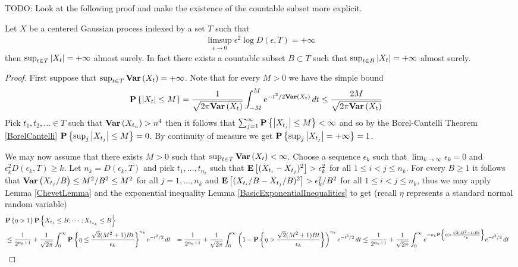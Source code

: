 TODO: Look at the following proof and make the existence of the countable subset more explicit.
\begin{thm}\label{SudakovChevet}Let $X$ be a centered Gaussian process indexed by a set $T$ such that 
\begin{align*}
\limsup_{\epsilon \to 0} \epsilon^2 \log D(\epsilon, T) = +\infty
\end{align*}
then $\sup_{t \in T} \left \vert X_t \right \vert = +\infty$ almost surely.  In fact there exists a countable subset $B \subset T$ such that $\sup_{t \in B} \left \vert X_t \right \vert = +\infty$ almost surely.
\end{thm}
\begin{proof}
First suppose that $\sup_{t \in T} \textbf{Var} \left (X_t \right ) = +\infty$.  Note that for every $M > 0$ we have the simple bound 
\begin{align*}
\textbf{P}\left \{\left \vert X_t \right \vert \leq M \right \} &= \frac{1}{\sqrt{2\pi \textbf{Var} \left (X_t \right )}} \int_{-M}^M e^{-t^2/2 \textbf{Var} \left (X_t \right )} \, dt \leq \frac{2M}{\sqrt{2\pi \textbf{Var} \left (X_t \right )}}
\end{align*} 
Pick $t_1, t_2, \dotsc \in T$ such that $\textbf{Var} \left (X_{t_n} \right ) > n^4$ then it follows that $\sum_{j=1}^\infty \textbf{P}\left \{\left \vert X_{t_j} \right \vert \leq M \right \} < \infty$ and so by the Borel-Cantelli Theorem \ref{BorelCantelli} $\textbf{P}\left \{\sup_j \left \vert X_{t_j} \right \vert \leq M \right \} = 0$.  By continuity of measure we get $\textbf{P}\left \{\sup_j \left \vert X_{t_j} \right \vert = +\infty \right \} = 1$.

We may now assume that  there exists $M > 0$ such that $\sup_{t \in T} \textbf{Var} \left (X_t \right ) < \infty$.  Choose a sequence $\epsilon_k$ such that $\lim_{k \to \infty} \epsilon_k = 0$ and $\epsilon_k^2 D(\epsilon_k, T) \geq k$.  Let $n_k = D(\epsilon_k, T)$ and pick $t_1, \dotsc, t_{n_k}$ such that $\textbf{E}\left[(X_{t_i} -X_{t_j})^2\right] > \epsilon_k^2$ for all $1 \leq i < j \leq n_k$.  For every $B \geq 1$ it follows that $\textbf{Var} \left (X_{t_j}/B \right ) \leq M^2/B^2 \leq M^2$ for all $j=1, \dotsc, n_k$ and $\textbf{E}\left[(X_{t_i}/B -X_{t_j}/B)^2\right] > \epsilon_k^2/B^2$ for all $1 \leq i < j \leq n_k$, thus we may apply Lemma \ref{ChevetLemma} and the exponential inequality Lemma \ref{BasicExponentialInequalities} to get (recall $\eta$ represents a standard normal random variable)
\begin{align*}
&\textbf{P}\left \{\eta > 1 \right \} \textbf{P}\left \{X_{t_1} \leq B; \dotsb ; X_{t_{n_k}} \leq B \right \} \\
&\leq \frac{1}{2^{n_k+1}} + \frac{1}{\sqrt{2\pi}} \int_0^\infty \textbf{P}\left \{\eta \leq \frac{\sqrt{2}(M^2+1)Bt}{\epsilon_k} \right \}^{n_k} e^{-t^2/2} \, dt
&= \frac{1}{2^{n_k+1}} + \frac{1}{\sqrt{2\pi}} \int_0^\infty \left(1 - \textbf{P}\left \{\eta > \frac{\sqrt{2}(M^2+1)Bt}{\epsilon_k} \right \} \right)^{n_k} e^{-t^2/2} \, dt
&\leq \frac{1}{2^{n_k+1}} + \frac{1}{\sqrt{2\pi}} \int_0^\infty e^{-n_k \textbf{P}\left \{\eta > \frac{\sqrt{2}(M^2+1)Bt}{\epsilon_k} \right \}}  e^{-t^2/2} \, dt
\end{align*}


\end{proof}
